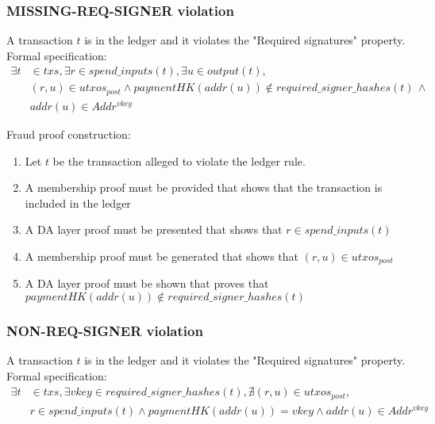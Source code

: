 \documentclass[../midgard.tex]{subfiles}
\begin{document}
\subsubsection{MISSING-REQ-SIGNER violation}
\label{violation:MISSING-REQ-SIGNER}
A transaction $t$ is in the ledger and it violates the "Required signatures" property.
Formal specification:
\begin{equation*}
\begin{split}
    \exists t & \in txs, \exists r \in spend\_inputs(t), \exists u \in output(t), \\
    & (r, u) \in utxos_{post} \land paymentHK(addr(u)) \notin required\_signer\_hashes(t) \, \land \\
    & addr(u) \in Addr^{vkey}
\end{split}
\end{equation*}

Fraud proof construction:
\begin{enumerate}
  \item Let $t$ be the transaction alleged to violate the ledger rule. 
  \item A membership proof must be provided that shows that the transaction is included in the ledger
  \item A DA layer proof must be presented that shows that $r \in spend\_inputs(t)$
  \item A membership proof must be generated that shows that $(r, u) \in utxos_{post}$
  \item A DA layer proof must be shown that proves that \\ $paymentHK(addr(u)) \notin required\_signer\_hashes(t)$
\end{enumerate}

\subsubsection{NON-REQ-SIGNER violation}
\label{violation:NON-REQ-SIGNER}
A transaction $t$ is in the ledger and it violates the "Required signatures" property.
Formal specification:
\begin{equation*}
\begin{split}
    \exists t & \in txs, \exists vkey \in required\_signer\_hashes(t), \nexists (r, u) \in utxos_{post}, \\
    & r \in spend\_inputs(t) \land paymentHK(addr(u)) = vkey \land addr(u) \in Addr^{vkey}
\end{split}
\end{equation*}
\end{document}
